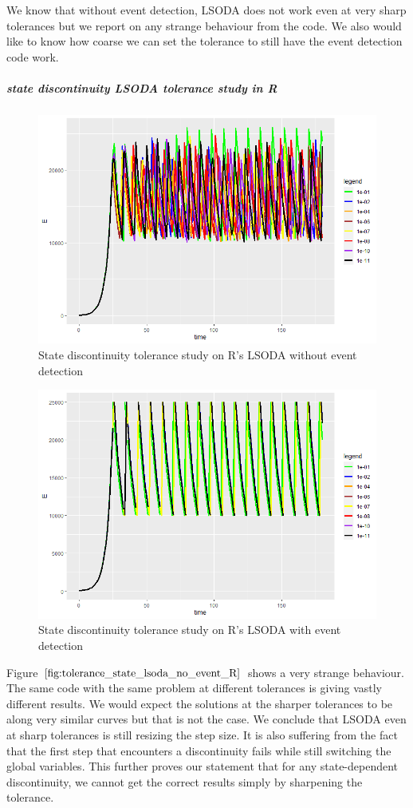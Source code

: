 We know that without event detection, LSODA does not work even at very sharp tolerances but we report on any strange behaviour from the code. We also would like to know how coarse we can set the tolerance to still have the event detection code work.

\subparagraph{state discontinuity LSODA tolerance study in R}

\begin{figure}[h]
	\centering
	\includegraphics[width=0.7\linewidth]{./figures/tolerance_state_lsoda_no_event_R}
	\caption{State discontinuity tolerance study on R's LSODA without event detection}
	\label{fig:tolerance_state_lsoda_no_event_R}
\end{figure}

\begin{figure}[h]
	\centering
	\includegraphics[width=0.7\linewidth]{./figures/tolerance_state_lsoda_with_event_R}
	\caption{State discontinuity tolerance study on R's LSODA with event detection}
	\label{fig:tolerance_state_lsoda_with_event_R}
\end{figure}

Figure $\ref{fig:tolerance_state_lsoda_no_event_R}$ shows a very strange behaviour. The same code with the same problem at different tolerances is giving vastly different results. We would expect the solutions at the sharper tolerances to be along very similar curves but that is not the case. We conclude that LSODA even at sharp tolerances is still resizing the step size. It is also suffering from the fact that the first step that encounters a discontinuity fails while still switching the global variables. This further proves our statement that for any state-dependent discontinuity, we cannot get the correct results simply by sharpening the tolerance.

